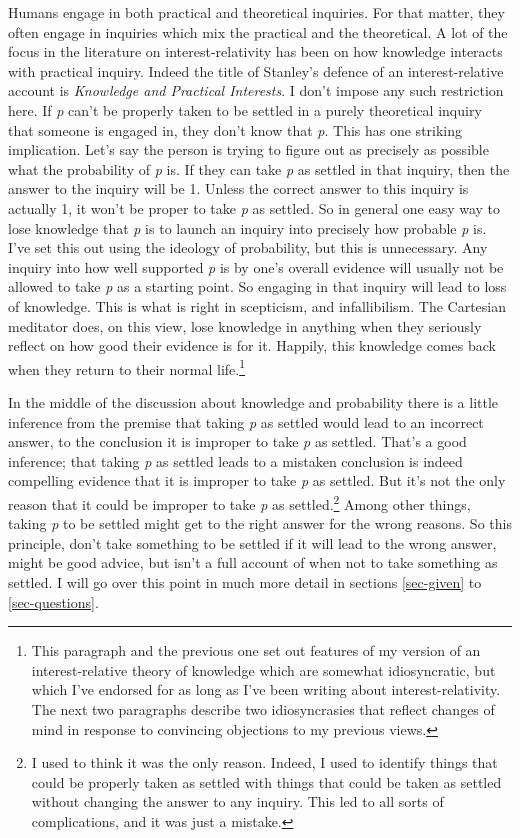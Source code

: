 \documentclass[
  12pt,
  letterpaper,
]{scrbook}
\begin{document}
Humans engage in both practical and theoretical inquiries. For that
matter, they often engage in inquiries which mix the practical and the
theoretical. A lot of the focus in the literature on interest-relativity
has been on how knowledge interacts with practical inquiry. Indeed the
title of Stanley's defence of an interest-relative account is
\emph{Knowledge and Practical Interests}. I don't impose any such
restriction here. If \emph{p} can't be properly taken to be settled in a
purely theoretical inquiry that someone is engaged in, they don't know
that \emph{p}. This has one striking implication. Let's say the person
is trying to figure out as precisely as possible what the probability of
\emph{p} is. If they can take \emph{p} as settled in that inquiry, then
the answer to the inquiry will be 1. Unless the correct answer to this
inquiry is actually 1, it won't be proper to take \emph{p} as settled.
So in general one easy way to lose knowledge that \emph{p} is to launch
an inquiry into precisely how probable \emph{p} is. I've set this out
using the ideology of probability, but this is unnecessary. Any inquiry
into how well supported \emph{p} is by one's overall evidence will
usually not be allowed to take \emph{p} as a starting point. So engaging
in that inquiry will lead to loss of knowledge. This is what is right in
scepticism, and infallibilism. The Cartesian meditator does, on this
view, lose knowledge in anything when they seriously reflect on how good
their evidence is for it. Happily, this knowledge comes back when they
return to their normal life.\footnote{This paragraph and the previous
  one set out features of my version of an interest-relative theory of
  knowledge which are somewhat idiosyncratic, but which I've endorsed
  for as long as I've been writing about interest-relativity. The next
  two paragraphs describe two idiosyncrasies that reflect changes of
  mind in response to convincing objections to my previous views.}

In the middle of the discussion about knowledge and probability there is
a little inference from the premise that taking \emph{p} as settled
would lead to an incorrect answer, to the conclusion it is improper to
take \emph{p} as settled. That's a good inference; that taking \emph{p}
as settled leads to a mistaken conclusion is indeed compelling evidence
that it is improper to take \emph{p} as settled. But it's not the only
reason that it could be improper to take \emph{p} as settled.\footnote{I
  used to think it was the only reason. Indeed, I used to identify
  things that could be properly taken as settled with things that could
  be taken as settled without changing the answer to any inquiry. This
  led to all sorts of complications, and it was just a mistake.} Among
other things, taking \emph{p} to be settled might get to the right
answer for the wrong reasons. So this principle, don't take something to
be settled if it will lead to the wrong answer, might be good advice,
but isn't a full account of when not to take something as settled. I
will go over this point in much more detail in sections \ref{sec-given}
to \ref{sec-questions}.
\end{document}
